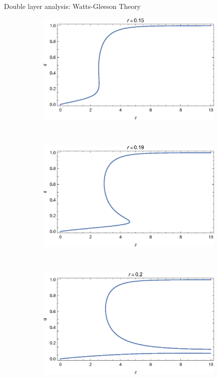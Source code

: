 \documentclass[10pt, xcolor=dvipsnames]{beamer}
\begin{document}
\begin{frame}{Double layer analysis: Watts-Gleeson Theory}
\begin{figure}
    \centering
    \begin{subfigure}[b]{0.4\textwidth}
        \includegraphics[width=\textwidth]{figures/two_layer_node_qz_r015}
    \end{subfigure}
    ~ %
    \begin{subfigure}[b]{0.4\textwidth}
        \includegraphics[width=\textwidth]{figures/two_layer_node_qz_r019}
    \end{subfigure}
    ~ %
    \begin{subfigure}[b]{0.4\textwidth}
        \includegraphics[width=\textwidth]{figures/two_layer_node_qz_r02}

\end{subfigure}
\end{figure}
\end{frame}
\end{document}
